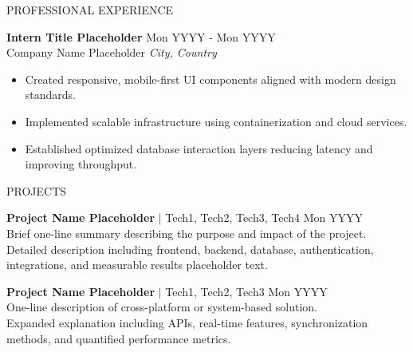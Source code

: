 \documentclass{resume} %
\begin{document}
\begin{rSection}{PROFESSIONAL EXPERIENCE}
\vspace*{-1mm}

\textbf{Intern Title Placeholder} \hfill Mon YYYY - Mon YYYY\\
Company Name Placeholder \hfill \textit{City, Country}
\vspace*{-1mm}
 \begin{itemize}
    \itemsep -3pt {} 
     \item Created responsive, mobile-first UI components aligned with modern design standards.
     \item Implemented scalable infrastructure using containerization and cloud services.
     \item Established optimized database interaction layers reducing latency and improving throughput.
 \end{itemize}

\end{rSection} 

\vspace*{-2mm}
\begin{rSection}{PROJECTS}
\vspace{-3mm}

\item \textbf{Project Name Placeholder} $|$ Tech1, Tech2, Tech3, Tech4 \hfill {Mon YYYY} \\
Brief one-line summary describing the purpose and impact of the project.\\
Detailed description including frontend, backend, database, authentication, integrations, and measurable results placeholder text.

\item \textbf{Project Name Placeholder} $|$ Tech1, Tech2, Tech3 \hfill {Mon YYYY}\\
{One-line description of cross-platform or system-based solution.}\\
{Expanded explanation including APIs, real-time features, synchronization methods, and quantified performance metrics.}

\end{rSection} 
\end{document}
